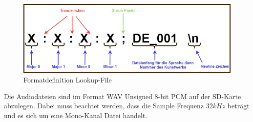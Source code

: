 \begin{figure}[H]
	\begin{center}
		\includegraphics[width=140mm]{data/Definition_file.jpg}
		\caption[Formatdefinition Lookup-File]{Formatdefinition Lookup-File} %
		\label{fig:definition_lookup_file}
	\end{center}
\end{figure}

Die Audiodateien sind im Format WAV Unsigned 8-bit PCM auf der SD-Karte abzulegen. Dabei muss beachtet werden, dass die Sample Frequenz $32 kHz$ beträgt und es sich um eine Mono-Kanal Datei handelt.
